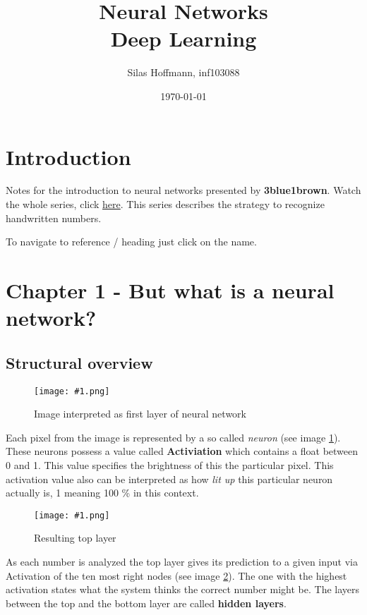 \documentclass{article}
\title{%
Neural Networks \\
\large Deep Learning}
\author{Silas Hoffmann, inf103088}
\date{\today}
\newcommand{\lbl}[1]{(see image \ref{#1})}
\newcommand{\img}[1]{
	\centering
	\texttt{[image: \#1.png]}
	\label{#1}
}
\begin{document}
\maketitle

\vspace{0.5cm}
\tableofcontents
\vspace{0.5cm}
\listoffigures
\vspace{0.5cm}

\section{Introduction}
Notes for the introduction to neural networks presented by \textbf{3blue1brown}. Watch the whole series, click \href{https://www.youtube.com/watch?v=aircAruvnKk}{\color{blue} {here}}. This series describes the strategy to recognize handwritten numbers.

To navigate to reference / heading just click on the name.

\clearpage

\section{Chapter 1 - But what is a neural network?}


\subsection{Structural overview}

\FloatBarrier

\begin{figure}[h]
\img{ai_1}
\caption{Image interpreted as first layer of neural network}
\end{figure}

Each pixel from the image is represented by a so called \textit{neuron} \lbl{ai_1}. These neurons possess a value called \textbf{Activiation} which contains a float between 0 and 1. This value specifies the brightness of this the particular pixel. This activation value also can be interpreted as how \textit{lit up} this particular neuron actually is, 1 meaning 100 \% in this context.


\begin{figure}[b!]
\img{ai_2}
\caption{Resulting top layer}
\end{figure}

As each number is analyzed the top layer gives its prediction to a given input via Activation of the ten most right nodes \lbl{ai_2}. The one with the highest activation states what the system thinks the correct number might be. The layers between the top and the bottom layer are called \textbf{hidden layers}. 
\end{document}
